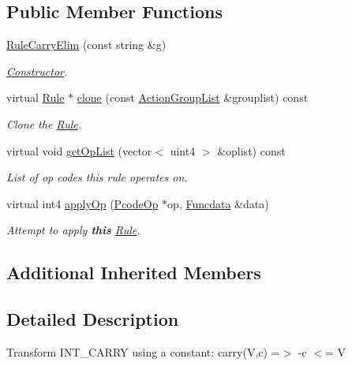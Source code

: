 \subsection*{Public Member Functions}
\begin{DoxyCompactItemize}
\item 
\mbox{\hyperlink{class_rule_carry_elim_ad0e7acbbcdcb6448efa67b6b8ff804e1}{Rule\+Carry\+Elim}} (const string \&g)
\begin{DoxyCompactList}\small\item\em \mbox{\hyperlink{class_constructor}{Constructor}}. \end{DoxyCompactList}\item 
virtual \mbox{\hyperlink{class_rule}{Rule}} $\ast$ \mbox{\hyperlink{class_rule_carry_elim_a31e871206ad24e926b0ae9d19825ef6b}{clone}} (const \mbox{\hyperlink{class_action_group_list}{Action\+Group\+List}} \&grouplist) const
\begin{DoxyCompactList}\small\item\em Clone the \mbox{\hyperlink{class_rule}{Rule}}. \end{DoxyCompactList}\item 
virtual void \mbox{\hyperlink{class_rule_carry_elim_ac3ef2d10c9add58bf9df5a26e99c80f6}{get\+Op\+List}} (vector$<$ uint4 $>$ \&oplist) const
\begin{DoxyCompactList}\small\item\em List of op codes this rule operates on. \end{DoxyCompactList}\item 
virtual int4 \mbox{\hyperlink{class_rule_carry_elim_ab7a660e29b328d6348a1cacace3d9844}{apply\+Op}} (\mbox{\hyperlink{class_pcode_op}{Pcode\+Op}} $\ast$op, \mbox{\hyperlink{class_funcdata}{Funcdata}} \&data)
\begin{DoxyCompactList}\small\item\em Attempt to apply {\bfseries{this}} \mbox{\hyperlink{class_rule}{Rule}}. \end{DoxyCompactList}\end{DoxyCompactItemize}
\subsection*{Additional Inherited Members}


\subsection{Detailed Description}
Transform I\+N\+T\+\_\+\+C\+A\+R\+RY using a constant\+: {\ttfamily carry(\+V,c) =$>$ -\/c $<$= V} 

